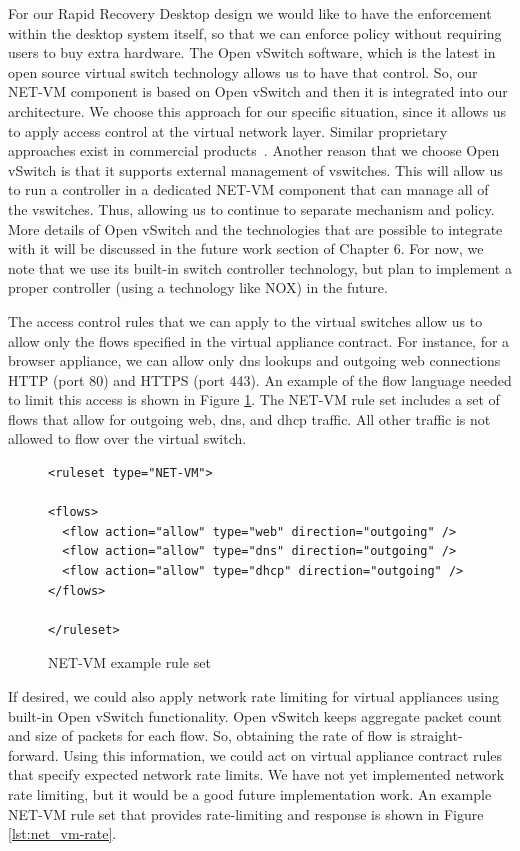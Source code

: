 For our Rapid Recovery Desktop design we would like to have the enforcement within the desktop system itself, so that we can enforce policy without requiring users to buy extra hardware. The Open vSwitch software, which is the latest in open source virtual switch technology allows us to have that control. So, our NET-VM component is based on Open vSwitch and then it is integrated into our architecture. We choose this approach for our specific situation, since it allows us to apply access control at the virtual network layer. Similar proprietary approaches exist in commercial products~\cite{vmware_vNetwork_Distributed_Switch_website, cisco_nexus_website}. Another reason that we choose Open vSwitch is that it supports external management of vswitches. This will allow us to run a controller in a dedicated NET-VM component that can manage all of the vswitches. Thus, allowing us to continue to separate mechanism and policy. More details of Open vSwitch and the technologies that are possible to integrate with it will be discussed in the future work section of Chapter 6. For now, we note that we use its built-in switch controller technology, but plan to implement a proper controller (using a technology like NOX\cite{nox_website}) in the future.

The access control rules that we can apply to the virtual switches allow us to allow only the flows specified in the virtual appliance contract. For instance, for a browser appliance, we can allow only dns lookups and outgoing web connections HTTP (port 80) and HTTPS (port 443). An example of the flow language needed to limit this access is shown in Figure \ref{lst:net_vm}. The NET-VM rule set includes a set of flows that allow for outgoing web, dns, and dhcp traffic. All other traffic is not allowed to flow over the virtual switch.

\begin{figure}[tbp]
\caption{NET-VM example rule set}
\label{lst:net_vm}
\begin{lstlisting}
<ruleset type="NET-VM">

<flows>
  <flow action="allow" type="web" direction="outgoing" />
  <flow action="allow" type="dns" direction="outgoing" />
  <flow action="allow" type="dhcp" direction="outgoing" />
</flows>

</ruleset>
\end{lstlisting}
\end{figure}

If desired, we could also apply network rate limiting for virtual appliances using built-in Open vSwitch functionality. Open vSwitch keeps aggregate packet count and size of packets for each flow. So, obtaining the rate of flow is straight-forward. Using this information, we could act on virtual appliance contract rules that specify expected network rate limits. We have not yet implemented network rate limiting, but it would be a good future implementation work.  An example NET-VM rule set that provides rate-limiting and response is shown in Figure \ref{lst:net_vm-rate}.


